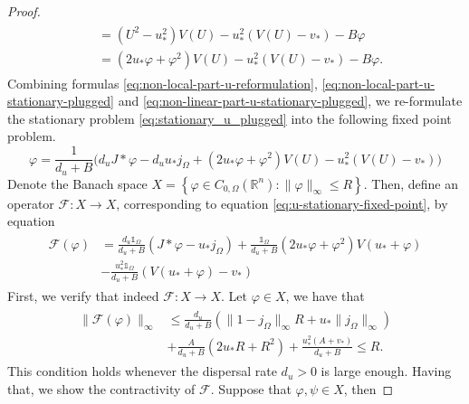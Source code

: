 \documentclass[12pt, a4paper]{article}
\theoremstyle{break}
\theoremstyle{break}
\theoremstyle{break}
\theoremstyle{break}
\theoremstyle{break}
\theoremstyle{break}
\theoremstyle{break}
\begin{document}
\begin{proof}
\begin{align}
\begin{split}
            &= (U^2 - u_*^2)V(U) - u_*^2(V(U) - v_*) - B \varphi \\
            &= (2 u_* \varphi + \varphi^2) V(U) - u_*^2(V(U) - v_*) - B \varphi.
        \end{split}
    \end{align}
    Combining formulas \eqref{eq:non-local-part-u-reformulation}, \eqref{eq:non-local-part-u-stationary-plugged} and \eqref{eq:non-linear-part-u-stationary-plugged}, we re-formulate the stationary problem \eqref{eq:stationary_u_plugged} into the following fixed point problem.
    \begin{equation}
        \label{eq:u-stationary-fixed-point}
        \varphi = \frac{1}{d_u + B}\Big(d_u J *\varphi - d_u u_* j_\Omega + (2 u_* \varphi + \varphi^2) V(U) - u_*^2(V(U) - v_*)\Big)
    \end{equation}
    Denote the Banach space $X = \left\{ \varphi \in C_{0,\Omega}(\mathbb{R}^n): \|\varphi\|_\infty \leq R \right\}$. Then, define an operator $\mathcal{F}: X \rightarrow X$, corresponding to equation \eqref{eq:u-stationary-fixed-point}, by equation
    \begin{align}
        \label{eq:operator-f-def}
        \begin{split}
            \mathcal{F}(\varphi) 
            &= 
            \frac{d_u \mathds{1}_{\Omega}}{d_u + B}\left( J *\varphi - u_* j_\Omega\right) + \frac{\mathds{1}_{\Omega}}{d_u + B}(2 u_* \varphi + \varphi^2) V (u_* + \varphi)\\
            &- \frac{u_*^2\mathds{1}_{\Omega}}{d_u + B}(V(u_* + \varphi) - v_*)        
        \end{split}
    \end{align}
    First, we verify that indeed $\mathcal{F}: X \rightarrow X$. Let $\varphi \in X$, we have that
    \begin{align}
        \label{eq:f_ball_to_ball_condition}
        \begin{split}
            \|\mathcal{F}(\varphi)\|_{\infty}
            &\leq
            \frac{d_u }{d_u + B} \left( \|1 -j_\Omega\|_\infty R + u_*\|j_\Omega\|_\infty\right) \\
            &+
            \frac{A}{d_u + B}\left( 2 u_* R + R^2 \right) 
            + \frac{u_*^2 (A + v_*)}{d_u + B} \leq R.
        \end{split}
    \end{align}
    This condition holds whenever the dispersal rate $d_u > 0$ is large enough. Having that, we show the contractivity of $\mathcal{F}$. Suppose that $\varphi, \psi \in X$, then

\end{proof}
\end{document}
